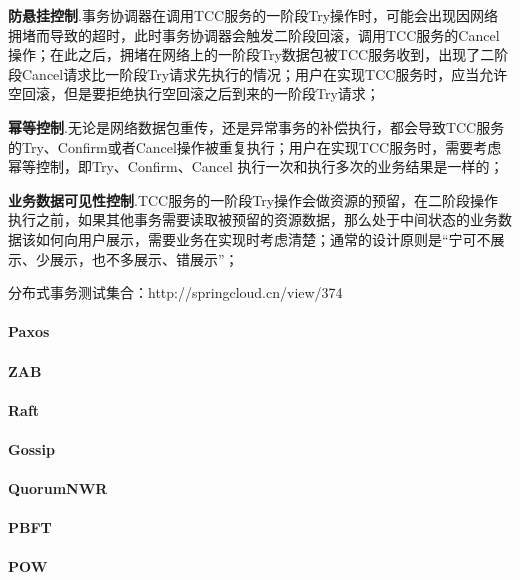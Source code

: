 \documentclass[../../../interview-questions.tex]{subfiles}
\begin{document}
\textbf{防悬挂控制}.事务协调器在调用TCC服务的一阶段Try操作时，可能会出现因网络拥堵而导致的超时，此时事务协调器会触发二阶段回滚，调用TCC服务的Cancel操作；在此之后，拥堵在网络上的一阶段Try数据包被TCC服务收到，出现了二阶段Cancel请求比一阶段Try请求先执行的情况；用户在实现TCC服务时，应当允许空回滚，但是要拒绝执行空回滚之后到来的一阶段Try请求；

\textbf{幂等控制}.无论是网络数据包重传，还是异常事务的补偿执行，都会导致TCC服务的Try、Confirm或者Cancel操作被重复执行；用户在实现TCC服务时，需要考虑幂等控制，即Try、Confirm、Cancel 执行一次和执行多次的业务结果是一样的；

\textbf{业务数据可见性控制}.TCC服务的一阶段Try操作会做资源的预留，在二阶段操作执行之前，如果其他事务需要读取被预留的资源数据，那么处于中间状态的业务数据该如何向用户展示，需要业务在实现时考虑清楚；通常的设计原则是“宁可不展示、少展示，也不多展示、错展示”；

分布式事务测试集合：http://springcloud.cn/view/374

\paragraph{Paxos}

\paragraph{ZAB}

\paragraph{Raft}

\paragraph{Gossip}

\paragraph{QuorumNWR}

\paragraph{PBFT}

\paragraph{POW}
\end{document}
